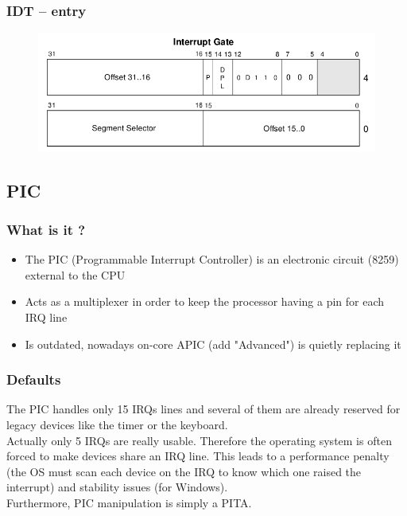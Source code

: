 \documentclass{beamer}
\begin{document}
\begin{frame}
  \frametitle{IDT -- entry}

  \begin{figure}
  \includegraphics[scale=0.38]{idte.png}
  \end{figure}
\end{frame}

\subsection{PIC}

\begin{frame}
  \frametitle{What is it ?}

  \begin{itemize}
  \item
    The PIC (Programmable Interrupt Controller) is an electronic circuit (8259) external to the CPU
  \item
    Acts as a multiplexer in order to keep the processor having a pin for each IRQ line
  \item
    Is outdated, nowadays on-core APIC (add "Advanced") is quietly replacing it
  \end{itemize}
\end{frame}

\begin{frame}
  \frametitle{Defaults}

    The PIC handles only 15 IRQs lines and several of them are already reserved for legacy devices like the timer or the keyboard.\\
    Actually only 5 IRQs are really usable. Therefore the operating system is often forced to make devices share an IRQ line. This leads to a performance penalty (the OS must scan each device on the IRQ to know which one raised the interrupt) and stability issues (for Windows).\\
  Furthermore, PIC manipulation is simply a PITA.
\end{frame}
\end{document}
